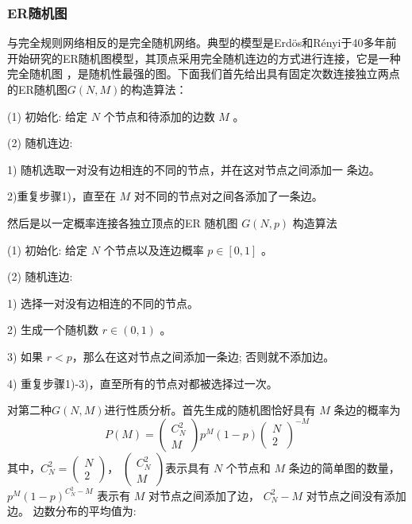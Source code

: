 \subsubsection{ER随机图}
与完全规则网络相反的是完全随机网络。典型的模型是Erdös和Rényi于40多年前开始研究的ER随机图模型，其顶点采用完全随机连边的方式进行连接，它是一种完全随机图
，是随机性最强的图。下面我们首先给出具有固定次数连接独立两点的ER随机图$G(N,M)$的构造算法：\par 
\noindent(1) 初始化: 给定 $N$ 个节点和待添加的边数 $M$ 。\par
\noindent(2) 随机连边:\par
1) 随机选取一对没有边相连的不同的节点，并在这对节点之间添加一 条边。\par
2)重复步骤1)，直至在 $M$ 对不同的节点对之间各添加了一条边。\par
然后是以一定概率连接各独立顶点的ER 随机图 $G(N,p)$ 构造算法\par
\noindent(1) 初始化: 给定 $N$ 个节点以及连边概率 $p \in[0,1]$ 。\par
\noindent(2) 随机连边:\par
1) 选择一对没有边相连的不同的节点。\par
2) 生成一个随机数 $r \in(0,1)$ 。\par
3) 如果 $r<p$，那么在这对节点之间添加一条边; 否则就不添加边。\par
4) 重复步骤1)-3)，直至所有的节点对都被选择过一次。\par
对第二种$G(N,M)$进行性质分析。首先生成的随机图恰好具有 $M$ 条边的概率为
\begin{equation}
    P(M)=\left(\begin{array}{c}
    C^2_N \\
    M
    \end{array}\right) p^M(1-p)\left(\begin{array}{c}
    N \\
    2
    \end{array}\right)^{-M}
\end{equation}
其中，$C^2_N=\left(\begin{array}{c}
    N \\
    2
    \end{array}\right)$，
$\left(\begin{array}{c}
    C^2_N \\
    M
    \end{array}\right)$表示具有 $N$ 个节点和 $M$ 条边的简单图的数量，
    $p^M(1-p)^{C^2_N-M}$ 
表示有 $M$ 对节点之间添加了边， $C^2_N-M$ 对节点之间没有添加边。
边数分布的平均值为:
